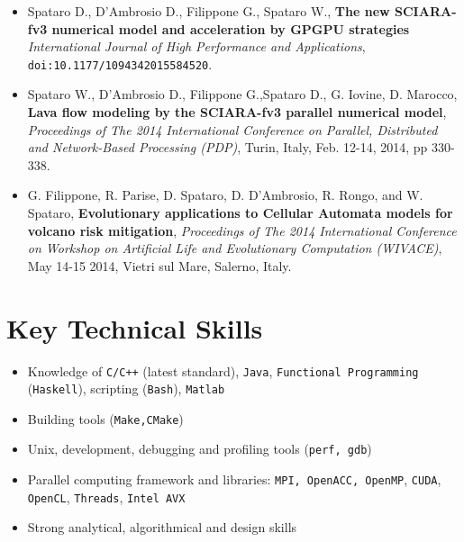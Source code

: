 \documentclass[a4paper,10pt]{article}
\begin{document}
\begin{itemize}
	\item Spataro D., D'Ambrosio D., Filippone G., Spataro W., \textbf{The new
	SCIARA-fv3 numerical model and acceleration by GPGPU strategies}
	\emph{International Journal of High Performance and Applications},
	\texttt{doi:10.1177/1094342015584520}.
	
	\item Spataro W., D'Ambrosio D., Filippone G.,Spataro D., G.
    Iovine, D. Marocco, \textbf{Lava flow modeling by the SCIARA-fv3
    parallel numerical model}, \emph{Proceedings of The 2014 International
    Conference on Parallel, Distributed and Network-Based Processing (PDP)}, Turin, Italy, Feb. 12-14,
    2014, pp 330-338.
    
    \item G. Filippone, R. Parise, D. Spataro,
	D. D'Ambrosio, R. Rongo, and W. Spataro, \textbf{Evolutionary
	applications to Cellular Automata models for volcano risk mitigation},
	\emph{Proceedings of The 2014 International Conference on Workshop on Artificial Life and
	Evolutionary Computation (WIVACE)}, May 14-15 2014, Vietri sul Mare, Salerno,
	Italy.
   

\end{itemize}

\begin{center}
\mbox{}
\end{center}

\section{Key Technical Skills}

	
	\begin{itemize}
		\item Knowledge of \texttt{C/C++} (latest standard), \texttt{Java}, \texttt{Functional Programming} (\texttt{Haskell}), scripting (\texttt{Bash}), \texttt{Matlab}
		\item Building tools (\texttt{Make,CMake})
		\item Unix,  development, debugging and profiling tools (\texttt{perf, gdb})
		\item Parallel computing framework and libraries: \texttt{MPI, OpenACC, OpenMP}, \texttt{CUDA}, \texttt{OpenCL}, \texttt{Threads}, \texttt{Intel AVX}
		\item Strong analytical, algorithmical and design skills
	\end{itemize}
		
		
\end{document}

